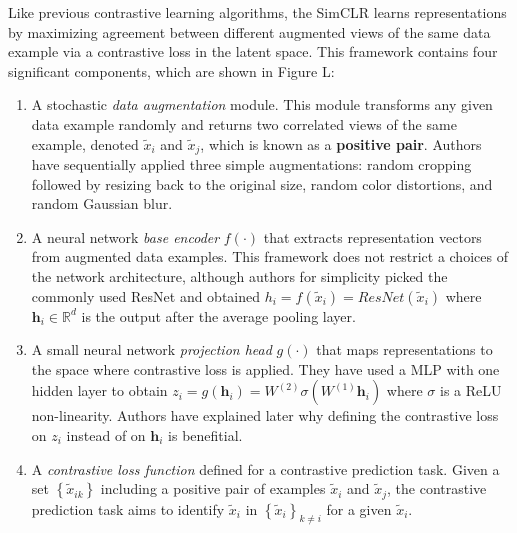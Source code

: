 \documentclass[
]{krantz}
\begin{document}
Like previous contrastive learning algorithms, the SimCLR learns representations by maximizing agreement between different augmented views of the same data example via a contrastive loss in the latent space. This framework contains four significant components, which are shown in Figure L:

\begin{enumerate}
\def\labelenumi{\arabic{enumi}.}
\item
  A stochastic \emph{data augmentation} module. This module transforms any given data example randomly and returns two correlated views of the same example, denoted \(\tilde{x}_{i}\) and \(\tilde{x}_{j}\), which is known as a \textbf{positive pair}. Authors have sequentially applied three simple augmentations: random cropping followed by resizing back to the original size, random color distortions, and random Gaussian blur.
\item
  A neural network \emph{base encoder} \(f\left( \cdot \right)\) that extracts representation vectors from augmented data examples. This framework does not restrict a choices of the network architecture, although authors for simplicity picked the commonly used ResNet and obtained \(h_i=f\left( \tilde{x}_{i} \right)=ResNet\left(\tilde{x}_{i}\right)\) where \(\textbf{h}_i\in \mathbb{R}^{d}\) is the output after the average pooling layer.
\item
  A small neural network \emph{projection head} \(g\left( \cdot \right)\) that maps representations to the space where contrastive loss is applied. They have used a MLP with one hidden layer to obtain \(z_i = g\left( \textbf{h}_i \right) = W^{\left( 2\right)}\sigma \left( W^{\left( 1\right)} \textbf{h}_i\right)\) where \(\sigma\) is a ReLU non-linearity. Authors have explained later why defining the contrastive loss on \(z_i\) instead of on \(\textbf{h}_i\) is benefitial.
\item
  A \emph{contrastive loss function} defined for a contrastive prediction task. Given a set \(\left\{ \tilde{x}_{ik} \right\}\) including a positive pair of examples \(\tilde{x}_{i}\) and \(\tilde{x}_{j}\), the contrastive prediction task aims to identify \(\tilde{x}_{i}\) in \(\left\{ \tilde{x}_{i} \right\}_{k\neq i}\) for a given \(\tilde{x}_{i}\).
\end{enumerate}
\end{document}
